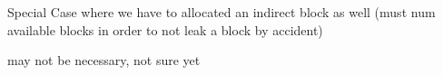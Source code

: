 
\begin{DoxyRefList}
\item[\label{todo__todo000001}%
\hypertarget{todo__todo000001}{}%
Member \hyperlink{ramdisk__ioctl_8c_aa837de32c6a6c1381d2684177520b8f1}{alloc\-Block\-For\-Node} (int index\-Node, int current\-Size)]Special Case where we have to allocated an indirect block as well (must num available blocks in order to not leak a block by accident)  
\item[\label{todo__todo000002}%
\hypertarget{todo__todo000002}{}%
Member \hyperlink{userdefines_8h_a824123490ad1617b58169fbc707e0653}{kr\-\_\-close} (int fd)]may not be necessary, not sure yet
\end{DoxyRefList}